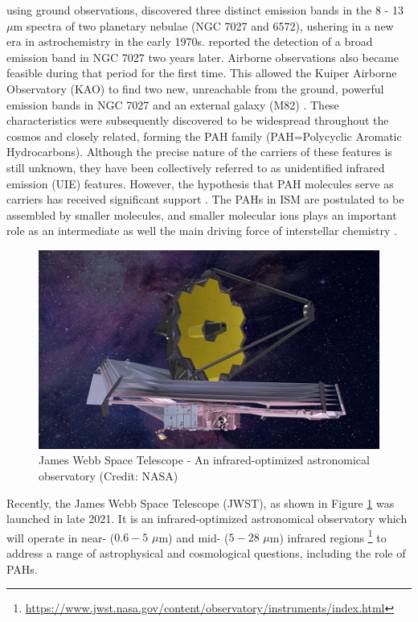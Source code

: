\citet{gillett_8_1973} using ground observations, discovered three distinct emission bands in the 8 - 13 $\mu$m spectra of two planetary nebulae (NGC 7027 and 6572), ushering in a new era in astrochemistry in the early 1970s. \citet{merrill_2_1975} reported the detection of a broad emission band in NGC 7027 two years later. Airborne observations also became feasible during that period for the first time. This allowed the Kuiper Airborne Observatory (KAO) to find two new, unreachable from the ground, powerful emission bands in NGC 7027 and an external galaxy (M82) \cite{russell_4_1977, willner_2_1977}. These characteristics were subsequently discovered to be widespread throughout the cosmos and closely related, forming the PAH family (PAH=Polycyclic Aromatic Hydrocarbons). Although the precise nature of the carriers of these features is still unknown, they have been collectively referred to as unidentified infrared emission (UIE) features. However, the hypothesis that PAH molecules serve as carriers has received significant support \cite{leger_identification_1984, allamandola_polycyclic_1985}. The PAHs in ISM are postulated to be 
assembled by smaller molecules, and smaller molecular ions plays an important role as an intermediate 
as well the main driving force of interstellar chemistry \cite{smith_ion_1992,herbst_dense_1988,CGP2015}.

\begin{figure}[!htb]
    \centering
    \includegraphics[scale=0.3]{figures/intro/JWST.jpg}
    \caption{James Webb Space Telescope - An infrared-optimized astronomical observatory (Credit: NASA)}
    \label{fig:JWST}
\end{figure}

Recently, the James Webb Space Telescope (JWST), as shown in Figure \ref{fig:JWST} was launched in late 2021. It is an infrared-optimized astronomical observatory which will operate in near- ($0.6 - 5$ $\mu$m) and mid- ($5 - 28$ $\mu$m) infrared regions \footnote{\url{https://www.jwst.nasa.gov/content/observatory/instruments/index.html}} to address a range of astrophysical and cosmological questions, including the role of PAHs.

